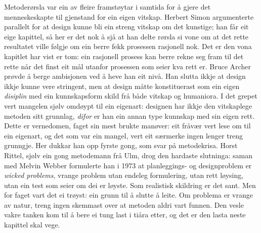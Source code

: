 Metoderørsla var ein av fleire framstøytar i samtida for å gjere det menneskeskapte til gjenstand for ein eigen vitskap. Herbert Simon argumenterte parallelt for at design kunne bli ein streng vitskap om det kunstige; han får eit eige kapittel, så her er det nok å sjå at han delte rørsla si vone om at det rette resultatet ville følgje om ein berre fekk prosessen rasjonell nok. Det er den vona kapitlet har vist er tom: ein rasjonell prosess kan berre rekne seg fram til det rette når det finst eit mål utanfor prosessen som seier kva rett er. Bruce Archer prøvde å berge ambisjonen ved å heve han eit nivå. Han slutta ikkje at design ikkje kunne vere stringent, men at design måtte konstituerast som ein eigen \emph{disiplin} med ein kunnskapsform skild frå både vitskap og humaniora\autocite{archer1979discipline}. I det grepet vert mangelen sjølv omdøypt til ein eigenart: designen har ikkje den vitskaplege metoden sitt grunnlag, \emph{difor} er han ein annan type kunnskap med sin eigen rett. Dette er vernedomen, faget sin mest brukte manøver: eit fråvær vert lese om til ein eigenart, og det som var ein mangel, vert eit særmerke ingen lenger treng grunngje. Her dukkar han opp fyrste gong, som svar på metodekrisa. Horst Rittel, sjølv ein gong metodemann frå Ulm, drog den hardaste slutninga: saman med Melvin Webber formulerte han i 1973 at planleggings- og designproblem er \emph{wicked problems}, vrange problem utan endeleg formulering, utan rett løysing, utan ein test som seier om dei er løyste\autocite{rittel1973}. Som realistisk skildring er det sant. Men for faget vart det ei trøyst: ein grunn til å slutte å leite. Om problema er vrange av natur, treng ingen skemmast over at metoden aldri vart funnen. Den vesle vakre tanken kom til å bere ei tung last i tiåra etter, og det er den lasta neste kapittel skal vege.


